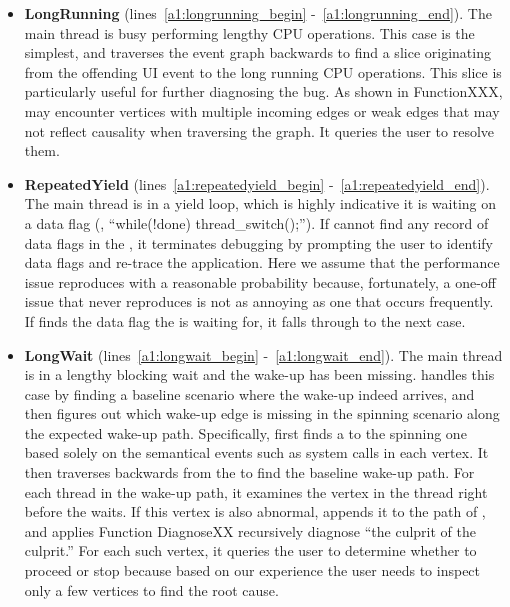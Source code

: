 \begin{itemize}

	\item \textbf{LongRunning} (lines~\ref{a1:longrunning_begin}
		-~\ref{a1:longrunning_end}). The main thread is busy performing lengthy CPU
		operations. This case is the simplest, and \xxx traverses the event graph
		backwards to find a slice originating from the offending UI event to the
		long running CPU operations. This slice is particularly useful for further
		diagnosing the bug. As shown in FunctionXXX, \xxx may encounter vertices with
		multiple incoming edges or weak edges that may not reflect causality when
		traversing the graph. It queries the user to resolve them.

	\item \textbf{RepeatedYield} (lines~\ref{a1:repeatedyield_begin}
		-~\ref{a1:repeatedyield_end}). The main thread is in a yield loop, which
		is highly indicative it is waiting on a data flag (\eg, ``while(!done)
		thread\_switch();''). If \xxx cannot find any record of data flags in the
		\spinningnode, it terminates debugging by prompting the user to identify data
		flags and re-trace the application. Here we assume that the performance issue
		reproduces with a reasonable probability because, fortunately, a one-off issue
		that never reproduces is not as annoying as one that occurs frequently. If
		\xxx finds the data flag the \spinningnode is waiting for, it falls through to
		the next case.

	\item \textbf{LongWait} (lines~\ref{a1:longwait_begin}
		-~\ref{a1:longwait_end}). The main thread is in a lengthy blocking wait and
		the wake-up has been missing. \xxx handles this case by finding a baseline
		scenario where the wake-up indeed arrives, and then figures out which wake-up
		edge is missing in the spinning scenario along the expected wake-up path.
		Specifically, \xxx first finds a \similarnode to the spinning one based solely
		on the semantical events such as system calls in each vertex. It then traverses
		backwards from the \similarnode to find the baseline wake-up path. For each
		thread in the wake-up path, it examines the vertex in the thread right before
		the \spinningnode waits. If this vertex is also abnormal, \xxx appends it
		to the path of \rootcausenodes, and applies Function DiagnoseXX recursively
		diagnose ``the culprit of the culprit.'' For each such vertex, it queries the
		user to determine whether to proceed or stop because based on our experience
		the user needs to inspect only a few vertices to find the root cause.

\end{itemize}

